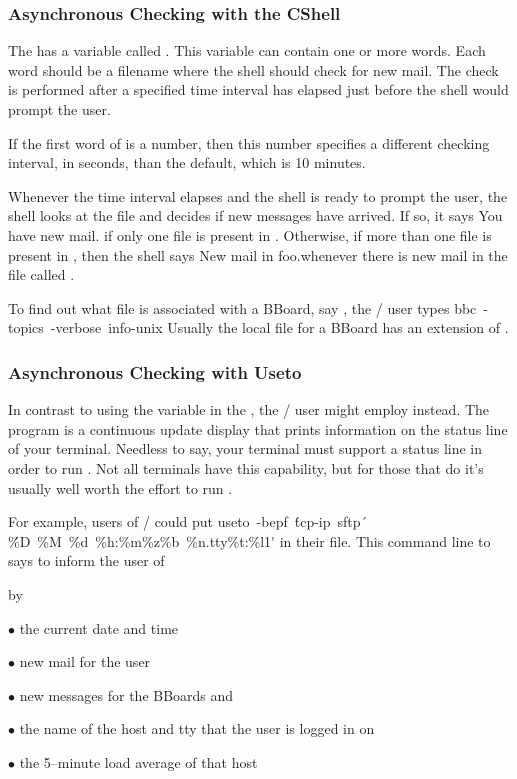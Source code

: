 \subsubsection{Asynchronous Checking with the CShell}
The  has a variable called .
This variable can contain one or more words.
Each word should be a filename where the shell should check for new mail.
The check is performed after a specified time interval has elapsed just
before the shell would prompt the user.

If the first word of  is a number,
then this number specifies a different checking interval, in seconds,
than the default, which is 10 minutes.

Whenever the time interval elapses and the shell is ready to prompt the user,
the shell looks at the file and decides if new messages have arrived.
If so, it says \example You have new mail.\endexample
if only one file is present in .
Otherwise,
if more than one file is present in ,
then the shell says \example New mail in foo.\endexample whenever there is new
mail in the file called .

To find out what file is associated with a BBoard, say ,
the \MH/ user types \example bbc\ -topics\ -verbose\ info-unix\endexample
Usually the local file for a BBoard has an extension of .

\subsubsection{Asynchronous Checking with Useto}
In contrast to using the  variable in the ,
the \MH/ user might employ  instead.%
The  program is a continuous update display that prints information
on the status line of your terminal.
Needless to say,
your terminal must support a status line in order to run .
Not all terminals have this capability,
but for those that do it's usually well worth the effort to run .

For example, users of \MH/  could put
\example
    useto\ -bepf\ \'tcp-ip\ sftp\'\ %
	\'\%D\ \%M\ \%d\ \%h:\%m\%z\%b\ \%n.tty\%t:\%l1\'%
\endexample
in their  file.
This command line to  says to inform the user of
\smallskip
{\advance\leftskip by\parindent
\item{$\bullet$} the current date and time
\item{$\bullet$} new mail for the user
\item{$\bullet$} new messages for the BBoards  and 
\item{$\bullet$} the name of the host and tty that the user is logged in on
\item{$\bullet$} the 5--minute load average of that host
\smallskip}

